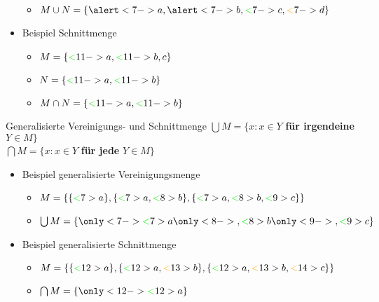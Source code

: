 \begin{frame}
\begin{itemize}[<+->]
\begin{itemize}[<+->]
        \item $M\cup N=\{\alert<7->{a},\alert<7->{b},\gruen<7->{c},\orongsch<7->{d}\}$
      \end{itemize}
      \Halbzeile
    \item Beispiel Schnittmenge
      \begin{itemize}[<+->]
        \item $M=\{\gruen<11->{a},\gruen<11->{b},c\}$
        \item $N=\{\gruen<11->{a},\gruen<11->{b}\}$
        \item $M\cap N=\{\gruen<11->{a},\gruen<11->{b}\}$
      \end{itemize}
  \end{itemize}
\end{frame}

\begin{frame}
  {Generalisierte Vereinigungs- und Schnittmenge}
  \onslide<+->
  \onslide<+->
  \alert{$\bigcup M =\{x: x\in Y$ \textbf{für irgendeine} $Y\in M\}$}\\
  \onslide<+->
  \alert{$\bigcap M =\{x: x\in Y$ \textbf{für jede} $Y\in M\}$}\\
  \Zeile 
  \begin{itemize}[<+->]
    \item Beispiel generalisierte Vereinigungsmenge
      \begin{itemize}[<+->]
        \item $M=\{\{\gruen<7>{a}\},\{\gruen<7>{a},\gruen<8>{b}\},\{\gruen<7>{a},\gruen<8>{b},\gruen<9>{c}\}\}$
        \item $\bigcup M=\{%
            \only<7->{\gruen<7>{a}}%
            \only<8->{,\gruen<8>{b}}%
            \only<9->{,\gruen<9>{c}}%
          \}$
      \end{itemize}
      \Halbzeile
    \item Beispiel generalisierte Schnittmenge
      \begin{itemize}[<+->]
        \item<10-> $M=\{\{\gruen<12>{a}\},\{\gruen<12>{a},\orongsch<13>{b}\},\{\gruen<12>{a},\orongsch<13>{b},\orongsch<14>{c}\}\}$
        \item<11-> $\bigcap M=\{%
            \only<12->{\gruen<12>{a}}
          \}$
      \end{itemize}
  \end{itemize}
\end{frame}

